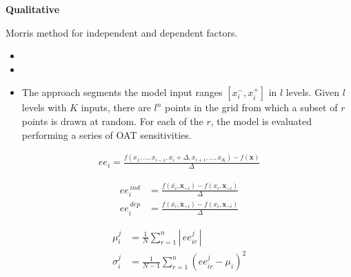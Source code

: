 \begin{frame}\begin{center}
		\LARGE\textbf{Qualitative}
\end{center}\end{frame}
\begin{frame} Morris method for independent and dependent factors.

\begin{itemize}\setlength\itemsep{1em}
  \item {}
  \item {}
\end{itemize}

\end{frame}
\begin{frame}

		\begin{itemize}
			\item  The approach segments the model input ranges $[x^-_i, x^+_i]$ in $l$ levels. Given $l$ levels with $K$ inputs, there are $l^n$ points in the grid from which a subset of $r$ points is drawn at random. For each of the $r$, the model is evaluated performing a series of OAT sensitivities.
		\end{itemize}

\end{frame}

\begin{frame}
	\begin{align*}
	  ee_i = \frac{f(x_1, \hdots, x_{i - 1}, x_i + \Delta, x_{i + 1}, \hdots, x_K) - f(\textbf{x})}{\Delta}
	\end{align*}
\end{frame}


\begin{frame}
	\begin{align*}
	ee^{\,ind}_i & = \frac{f(\bar{x_i}, \textbf{x}_{\sim i})- f(x_i, \textbf{x}_{\sim i})}{\Delta} \\
	ee^{\,dep}_i & = \frac{f(\bar{x_i}, \bar{\textbf{x}}_{\sim i})- f(x_i, \textbf{x}_{\sim i})}{\Delta}
	\end{align*}
\end{frame}

\begin{frame}
	\begin{align*}
	  \mu^j_i    & = \frac{1}{N}\sum_{r = 1}^n |\, ee^j_{ir}\,| \\
	  \sigma^j_i & = \frac{1}{N - 1}\sum_{r = 1}^n (ee^j_{ir} - \mu_i)^2
	\end{align*}

\end{frame}
